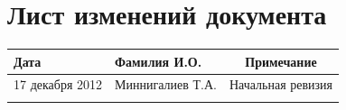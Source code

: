 \documentclass{article}
\begin{document}
\newpage
\section{Лист изменений документа}

\begin{tabular}{|l|l|c|} \hline
Дата & Фамилия И.О. & Примечание \\ \hline
17 декабря 2012 & Миннигалиев Т.А. & Начальная ревизия \\ \hline
 &  &  \\ \hline
\end{tabular}
\end{document}
